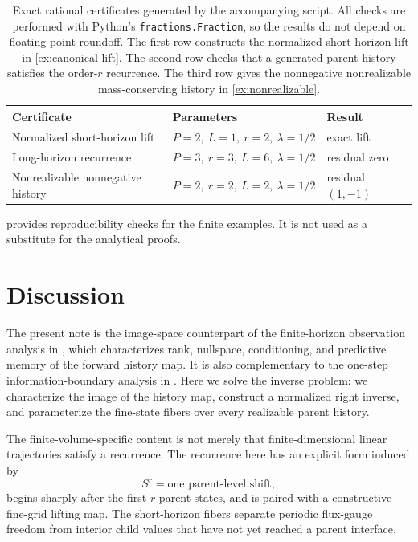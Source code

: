 \documentclass[11pt]{article}
\begin{document}
\begin{table}[htbp]
\centering
\caption{Exact rational certificates generated by the accompanying script.
All checks are performed with Python's \texttt{fractions.Fraction}, so the
results do not depend on floating-point roundoff.  The first row constructs
the normalized short-horizon lift in \cref{ex:canonical-lift}.  The second
row checks that a generated parent history satisfies the order-\(r\)
recurrence.  The third row gives the nonnegative nonrealizable
mass-conserving history in \cref{ex:nonrealizable}.}
\label{tab:certificates}
\begin{tabular}{@{}lll@{}}
\toprule
Certificate & Parameters & Result \\
\midrule
Normalized short-horizon lift & \(P=2,\ L=1,\ r=2,\ \lambda=1/2\) & exact lift \\
Long-horizon recurrence & \(P=3,\ r=3,\ L=6,\ \lambda=1/2\) & residual zero \\
Nonrealizable nonnegative history & \(P=2,\ r=2,\ L=2,\ \lambda=1/2\) & residual \((1,-1)\) \\
\bottomrule
\end{tabular}
\end{table}

 provides reproducibility checks for the finite
examples.  It is not used as a substitute for the analytical proofs.

\section{Discussion}
\label{sec:discussion}

The present note is the image-space counterpart of the finite-horizon
observation analysis in
\cite{polemitis2026exactfinitehorizonmemoryconditioning}, which
characterizes rank, nullspace, conditioning, and predictive memory of the
forward history map.  It is also complementary to the one-step
information-boundary analysis in
\cite{PolemitisChristakisDrikakis2026OneStep}.  Here we solve the inverse
problem: we characterize the image of the history map, construct a normalized
right inverse, and parameterize the fine-state fibers over every realizable
parent history.

The finite-volume-specific content is not merely that finite-dimensional
linear trajectories satisfy a recurrence.  The recurrence here has an
explicit form induced by
\[
  S^r=\text{one parent-level shift},
\]
begins sharply after the first \(r\) parent states, and is paired with a
constructive fine-grid lifting map.  The short-horizon fibers separate
periodic flux-gauge freedom from interior child values that have not yet
reached a parent interface.
\end{document}
